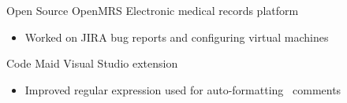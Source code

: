 \cventry
    {Open Source}
    {OpenMRS}
    {Electronic medical records platform}
    {}
    {}
    {\begin{itemize}
        \item Worked on JIRA bug reports and configuring virtual machines
    \end{itemize}}
\cventry
    {}
    {Code Maid}
    {Visual Studio extension}
    {}
    {}
    {\begin{itemize}
        \item Improved regular expression used for auto-formatting \csharp\ comments
    \end{itemize}}
